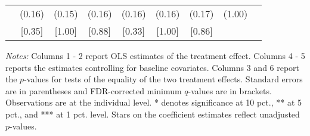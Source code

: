\begin{table}[htbp]
{\begin{threeparttable}
\begin{tabular}{l*{8}{c}}
          &   (0.16)&   (0.15)&   (0.16)&   (0.16)&   (0.16)&   (0.17)&   (1.00)&         \\
          &   [0.35]&   [1.00]&   [0.88]&   [0.33]&   [1.00]&   [0.86]&         &         \\
\bottomrule \end{tabular} \begin{tablenotes}[flushleft] \footnotesize \item \emph{Notes:} Columns 1 - 2 report OLS estimates of the treatment effect. Columns 4 - 5 reports the estimates controlling for baseline covariates. Columns 3 and 6 report the \(p\)-values for tests of the equality of the two treatment effects. Standard errors are in parentheses and FDR-corrected minimum \(q\)-values are in brackets. Observations are at the individual level. * denotes significance at 10 pct., ** at 5 pct., and *** at 1 pct. level. Stars on the coefficient estimates reflect unadjusted \(p\)-values. \end{tablenotes} \end{threeparttable} } \end{table}

